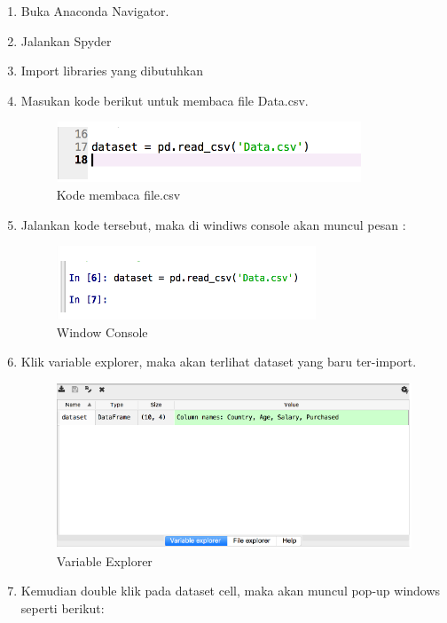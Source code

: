 \begin{enumerate}
		\begin{enumerate}
			\item Buka Anaconda Navigator.
			\item Jalankan Spyder
			\item Import libraries yang dibutuhkan
			\item Masukan kode berikut untuk membaca file Data.csv.
				\begin{figure}[ht]
				\centering
				\includegraphics[scale=0.8]{figures/AFS/2.png}
				\caption{Kode membaca file.csv}
				\label{contoh}
				\end{figure}
			\item Jalankan kode tersebut, maka di windiws console akan muncul pesan :
				\begin{figure}[ht]
				\centering
				\includegraphics[scale=0.9]{figures/AFS/3.png}
				\caption{ Window Console}
				\label{contoh}
				\end{figure}
			\item Klik variable explorer, maka akan terlihat dataset yang baru ter-import.
				\begin{figure}[ht]
				\centering
				\includegraphics[scale=0.6]{figures/AFS/4.png}
				\caption{Variable Explorer}
				\label{contoh}
				\end{figure}
			\item Kemudian double klik pada dataset cell, maka akan muncul pop-up windows seperti berikut: 
				\begin{figure}[ht]

\end{figure}
\end{enumerate}
\end{enumerate}
